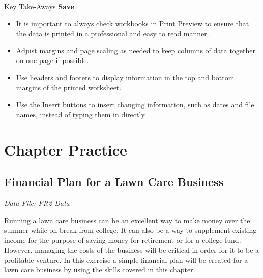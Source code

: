 \begin{center}
	\begin{tkwbox}{Key Take-Aways}
		\textbf{Save}
		\\
		\begin{itemize}
			\setlength{\itemsep}{0pt}
			\setlength{\parskip}{0pt}
			\setlength{\parsep}{0pt}
			
			\item It is important to always check workbooks in Print Preview to ensure that the data is printed in a professional and easy to read manner.
			\item Adjust margins and page scaling as needed to keep columns of data together on one page if possible.
			\item Use headers and footers to display information in the top and bottom margins of the printed worksheet.
			\item Use the Insert buttons to insert changing information, such as dates and file names, instead of typing them in directly.
			
		\end{itemize}
	\end{tkwbox}
\end{center}

\section{Chapter Practice}

\subsection{Financial Plan for a Lawn Care Business}

\textit{Data File: PR2 Data}

Running a lawn care business can be an excellent way to make money over the summer while on break from college. It can also be a way to supplement  existing income for the purpose of saving money for retirement or for a college fund. However, managing the costs of the business will be critical in order for it to be a profitable venture. In this exercise a simple financial plan will be created for a lawn care business by using the skills covered in this chapter.

